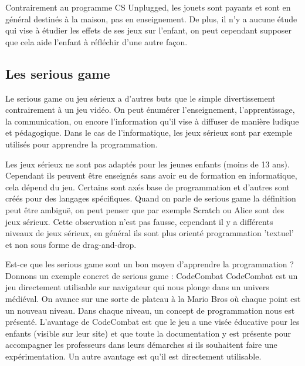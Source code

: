 Contrairement au programme CS Unplugged, les jouets sont payants et sont en général destinés à la maison, pas en enseignement. De plus, il n'y a aucune étude qui vise à étudier les effets de ses jeux sur l'enfant, on peut cependant supposer que cela aide l'enfant à réfléchir d'une autre façon.

\newpage

\subsection{Les serious game}

Le serious game ou jeu sérieux a d'autres buts que le simple divertissement contrairement à un jeu vidéo. On peut énumérer l’enseignement, l’apprentissage, la communication, ou encore l’information qu'il vise à diffuser de manière ludique et pédagogique. Dans le cas de l'informatique, les jeux sérieux sont par exemple utilisés pour apprendre la programmation.

Les jeux sérieux ne sont pas adaptés pour les jeunes enfants (moins de 13 ans). Cependant ils peuvent être enseignés sans avoir eu de formation en informatique, cela dépend du jeu. Certains sont axés base de programmation et d'autres sont créés pour des langages spécifiques. Quand on parle de serious game la définition peut être ambiguë, on peut penser que par exemple Scratch ou Alice sont des jeux sérieux. Cette observation n'est pas fausse, cependant il y a différents niveaux de jeux sérieux, en général ils sont plus orienté programmation 'textuel' et non sous forme de drag-and-drop.

Est-ce que les serious game sont un bon moyen d'apprendre la programmation ? Donnons un exemple concret de serious game : CodeCombat \cite{38} CodeCombat est un jeu directement utilisable sur navigateur qui nous plonge dans un univers médiéval. On avance sur une sorte de plateau à la Mario Bros où chaque point est un nouveau niveau. Dans chaque niveau, un concept de programmation nous est présenté. L'avantage de CodeCombat est que le jeu a une visée éducative pour les enfants (visible sur leur site) et que toute la documentation y est présente pour accompagner les professeurs dans leurs démarches si ils souhaitent faire une expérimentation. Un autre avantage est qu'il est directement utilisable.

